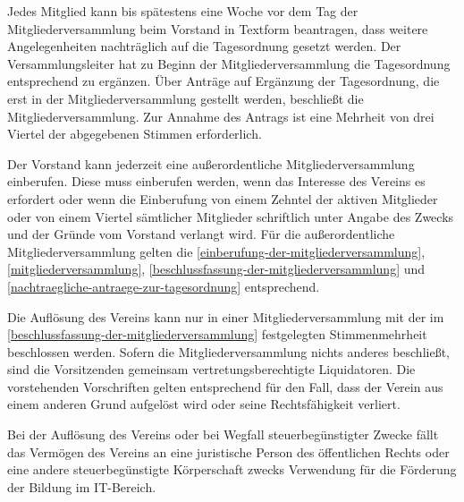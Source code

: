 \documentclass[parskip]{scrartcl}
\begin{document}
\begin{contract}
\label{nachtraegliche-antraege-zur-tagesordnung}

Jedes Mitglied kann bis spätestens eine Woche vor dem Tag der Mitgliederversammlung beim Vorstand in Textform beantragen, dass weitere Angelegenheiten nachträglich auf die Tagesordnung gesetzt werden. Der Versammlungsleiter hat zu Beginn der Mitgliederversammlung die Tagesordnung entsprechend zu ergänzen. Über Anträge auf Ergänzung der Tagesordnung, die erst in der Mitgliederversammlung gestellt werden, beschließt die Mitgliederversammlung. Zur Annahme des Antrags ist eine Mehrheit von drei Viertel der abgegebenen Stimmen erforderlich.


Der Vorstand kann jederzeit eine außerordentliche Mitgliederversammlung einberufen. Diese muss einberufen werden, wenn das Interesse des Vereins es erfordert oder wenn die Einberufung von einem Zehntel der aktiven Mitglieder oder von einem Viertel sämtlicher Mitglieder schriftlich unter Angabe des Zwecks und der Gründe vom Vorstand verlangt wird. Für die außerordentliche Mitgliederversammlung gelten die \ref{einberufung-der-mitgliederversammlung}, \ref{mitgliederversammlung}, \ref{beschlussfassung-der-mitgliederversammlung} und \ref{nachtraegliche-antraege-zur-tagesordnung} entsprechend.


Die Auflösung des Vereins kann nur in einer Mitgliederversammlung mit der im \ref{beschlussfassung-der-mitgliederversammlung} festgelegten Stimmenmehrheit beschlossen werden. Sofern die Mitgliederversammlung nichts anderes beschließt, sind die Vorsitzenden gemeinsam vertretungsberechtigte Liquidatoren. Die vorstehenden Vorschriften gelten entsprechend für den Fall, dass der Verein aus einem anderen Grund aufgelöst wird oder seine Rechtsfähigkeit verliert.

Bei der Auflösung des Vereins oder bei Wegfall steuerbegünstigter Zwecke fällt das Vermögen des Vereins an eine juristische Person des öffentlichen Rechts oder eine andere steuerbegünstigte Körperschaft zwecks Verwendung für die Förderung der Bildung im IT-Bereich.
\end{contract}
\end{document}
